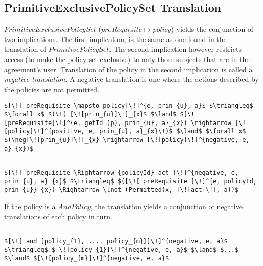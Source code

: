 \subsection{PrimitiveExclusivePolicySet Translation}
$PrimitiveExclusivePolicySet$ ($preRequisite \mapsto policy$) yields the conjunction of two implications. The first implication, is the same as one found in the translation of $PrimitivePolicySet$. The second implication however restricts access (to make the policy set exclusive) to only those subjects that are in the agreement's user. Translation of the policy in the second implication is called a \emph{negative translation}. A negative translation is one where the actions described by the policies are not permitted. 


\lstset{mathescape, language=AST}  
\begin{lstlisting}[frame=single, caption={Policy Set Translation {$\colon$} PrimitiveExclusivePolicySet},label={lst:transpolicyformulaPrimitiveExclusivePolicySet}]
$[\![ preRequisite \mapsto policy]\!]^{e, prin_{u}, a}$ $\triangleq$ $\forall x$ $(\!( [\![prin_{u}]\!]_{x}$ $\land$ $[\![preRequisite]\!]^{e, getId (p), prin_{u}, a}_{x}) \rightarrow [\![policy]\!]^{positive, e, prin_{u}, a}_{x}\!)$ $\land$ $\forall x$ $(\neg[\![prin_{u}]\!]_{x} \rightarrow [\![policy]\!]^{negative, e, a}_{x})$
\end{lstlisting}


\lstset{mathescape, language=AST}  
\begin{lstlisting}[frame=single, caption={Negative Policy Translation {$\colon$} Single policy},label={lst:transpolicynegativeSingle}]

$[\![ preRequisite \Rightarrow_{policyId} act ]\!]^{negative, e, prin_{u}, a}_{x}$ $\triangleq$ $([\![ preRequisite ]\!]^{e, policyId, prin_{u}}_{x}) \Rightarrow \lnot (Permitted(x, [\![act]\!], a))$
\end{lstlisting}

If the policy is a $AndPolicy$, the translation yields a conjunction of negative translations of each policy in turn.

\lstset{mathescape, language=AST}  
\begin{lstlisting}[frame=single, caption={Negative Policy Translation {$\colon$} List of policies},label={lst:transpolicynegativeListOfPolicies}]

$[\![ and [policy_{1}, ..., policy_{m}]]\!]^{negative, e, a}$ $\triangleq$ $[\![policy_{1}]\!]^{negative, e, a}$ $\land$ $...$ $\land$ $[\![policy_{m}]\!]^{negative, e, a}$

\end{lstlisting}

